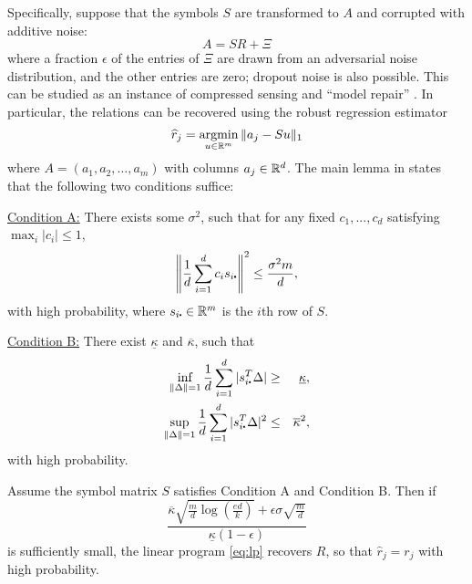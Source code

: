 Specifically, suppose that the symbols \(S\) are transformed to \(A\) and corrupted with additive noise:
\begin{equation}
  A = SR + \Xi
\end{equation}
where a fraction \(\epsilon\) of the entries of \(\Xi\) are drawn from an adversarial noise distribution, and the other entries are zero; dropout noise is also possible.
This can be studied as an instance of compressed sensing and ``model repair'' \citep{candes_randall,model_repair}.  In particular, the relations can be recovered using the  robust regression estimator
\begin{equation}
  \widehat r_j = \mathop{\rm argmin}_{u \in\mathbb{R}^m} \| a_j - S u\|_1 \label{eq:lp}
\end{equation}
where \(A = (a_1,a_2,\ldots, a_m)\) with columns \(a_j\in\mathbb{R}^d\).
The main lemma in \cite{model_repair} states that the following two conditions suffice:

\underline{Condition A:}
  There exists some \(\sigma^2\), such that for any fixed \(c_1,...,c_d\) satisfying \(\max_i|c_i|\leq 1\),
  \begin{equation}
    \left\|\frac{1}{d}\sum_{i=1}^d c_i s_{i\rdot} \right\|^2\leq \frac{\sigma^2 m}{d},
  \end{equation}
with high probability, where \(s_{i\rdot}\in\reals^m\) is the \(i\)th row of \(S\).

\underline{Condition B:}
  There exist \(\underline{\kappa}\) and \(\overline{\kappa}\), such that
  \begin{eqnarray}
  \label{eq:l1-upper-A} \inf_{\|\Delta\|=1}\frac{1}{d}\sum_{i=1}^d|s_{i\rdot}^T\Delta| &\geq& \underline{\kappa}, \\
  \label{eq:l2-upper-A} \sup_{\|\Delta\|=1}\frac{1}{d}\sum_{i=1}^d|s_{i\rdot}^T\Delta|^2 &\leq& \overline{\kappa}^2,
  \end{eqnarray}
  with high probability.

\begin{thm}\label{theorem:main-improved}
  Assume the symbol matrix \(S\) satisfies Condition A and Condition B. Then if
  \begin{equation}
  \frac{\overline{\kappa}\sqrt{\frac{m}{d}\log\left(\frac{e d}{k}\right)}+\epsilon\sigma\sqrt{\frac{m}{d}}}{\underline{\kappa}(1-\epsilon)}
  \end{equation}
  is sufficiently small, the linear program \eqref{eq:lp} recovers \(R\), so that \(\hat r_j = r_j\) with high probability.
  \end{thm}

